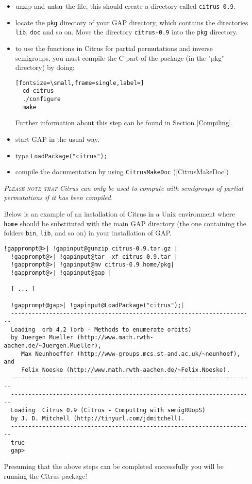 \documentclass[a4paper,11pt]{report}
\begin{document}
{{\begin{itemize}
\noindent\vspace{\baselineskip} \href{http://www-history.mcs.st-and.ac.uk/~jamesm/citrus/index.html } {\texttt{http://www-history.mcs.st-and.ac.uk/\texttt{}jamesm/citrus/index.html }} 
\item  unzip and untar the file, this should create a directory called \texttt{citrus-0.9}.
\item  locate the \texttt{pkg} directory of your \textsf{GAP} directory, which contains the directories \texttt{lib}, \texttt{doc} and so on. Move the directory \texttt{citrus-0.9} into the \texttt{pkg} directory. 
\item  to use the functions in \textsf{Citrus} for partial permutations and inverse semigroups, you must compile the C part
of the package (in the "pkg" directory) by doing: 
\begin{Verbatim}[fontsize=\small,frame=single,label=]
  cd citrus
  ./configure
  make
\end{Verbatim}
 Further information about this step can be found in Section \ref{Compiling}. 
\item  start \textsf{GAP} in the usual way.
\item  type \texttt{LoadPackage("citrus");}
\item  compile the documentation by using \texttt{CitrusMakeDoc} (\ref{CitrusMakeDoc}) 
\end{itemize}
 \emph{\textsc{Please note that} \textsf{Citrus} can only be used to compute with semigroups of partial permutations if it has
been compiled. }

 Below is an example of an installation of \textsf{Citrus} in a Unix environment where \texttt{home} should be substituted with the main \textsf{GAP} directory (the one containing the folders \texttt{bin}, \texttt{lib}, and so on) in your installation of \textsf{GAP}.

 
\begin{Verbatim}[commandchars=!@|,fontsize=\small,frame=single,label=Example]
  !gapprompt@>| !gapinput@gunzip citrus-0.9.tar.gz |
  !gapprompt@>| !gapinput@tar -xf citrus-0.9.tar |
  !gapprompt@>| !gapinput@mv citrus-0.9 home/pkg|
  !gapprompt@>| !gapinput@gap |
  
  [ ... ]
  
  !gapprompt@gap>| !gapinput@LoadPackage("citrus");|
  ----------------------------------------------------------------------
  Loading  orb 4.2 (orb - Methods to enumerate orbits)
  by Juergen Mueller (http://www.math.rwth-aachen.de/~Juergen.Mueller),
     Max Neunhoeffer (http://www-groups.mcs.st-and.ac.uk/~neunhoef), and
     Felix Noeske (http://www.math.rwth-aachen.de/~Felix.Noeske).
  ----------------------------------------------------------------------
  ----------------------------------------------------------------------
  Loading  Citrus 0.9 (Citrus - ComputIng wiTh semigRUopS)
  by J. D. Mitchell (http://tinyurl.com/jdmitchell).
  ----------------------------------------------------------------------
  true
  gap>
\end{Verbatim}
 Presuming that the above steps can be completed successfully you will be
running the \textsf{Citrus} package!

}}
\end{document}
